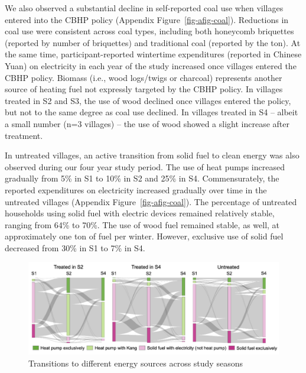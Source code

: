 \documentclass[
  letterpaper,
  DIV=11,
  numbers=noendperiod]{scrartcl}
\begin{document}
We also observed a substantial decline in self-reported coal use when
villages entered into the CBHP policy (Appendix
Figure~\ref{fig-afig-coal}). Reductions in coal use were consistent
across coal types, including both honeycomb briquettes (reported by
number of briquettes) and traditional coal (reported by the ton). At the
same time, participant-reported wintertime expenditures (reported in
Chinese Yuan) on electricity in each year of the study increased once
villages entered the CBHP policy. Biomass (i.e., wood logs/twigs or
charcoal) represents another source of heating fuel not expressly
targeted by the CBHP policy. In villages treated in S2 and S3, the use
of wood declined once villages entered the policy, but not to the same
degree as coal use declined. In villages treated in S4 -- albeit a small
number (n=3 villages) -- the use of wood showed a slight increase after
treatment.

In untreated villages, an active transition from solid fuel to clean
energy was also observed during our four year study period. The use of
heat pumps increased gradually from 5\% in S1 to 10\% in S2 and 25\% in
S4. Commensurately, the reported expenditures on electricity increased
gradually over time in the untreated villages (Appendix
Figure~\ref{fig-afig-coal}). The percentage of untreated households
using solid fuel with electric devices remained relatively stable,
ranging from 64\% to 70\%. The use of wood fuel remained stable, as
well, at approximately one ton of fuel per winter. However, exclusive
use of solid fuel decreased from 30\% in S1 to 7\% in S4.

\begin{figure}[H]

{\centering \includegraphics[width=1\textwidth,height=\textheight]{images/sankey.png}

}

\caption{\label{fig-sankey}Transitions to different energy sources
across study seasons}

\end{figure}
\end{document}
